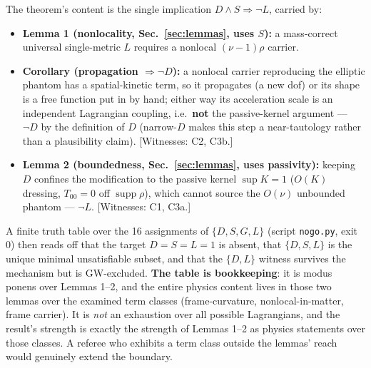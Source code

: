 \documentclass[11pt]{article}
\begin{document}
The theorem's content is the single implication $D\wedge S\Rightarrow\lnot L$, carried by:
\begin{itemize}
\item \textbf{Lemma 1 (nonlocality, Sec.~\ref{sec:lemmas}, uses $S$):} a mass-correct universal single-metric $L$ requires a nonlocal $(\nu-1)\rho$ carrier.
\item \textbf{Corollary (propagation $\Rightarrow\lnot D$):} a nonlocal carrier reproducing the elliptic phantom has a spatial-kinetic term, so it propagates (a new dof) or its shape is a free function put in by hand; either way its acceleration scale is an independent Lagrangian coupling, i.e.\ \textbf{not} the passive-kernel argument --- $\lnot D$ by the definition of $D$ (narrow-$D$ makes this step a near-tautology rather than a plausibility claim). [Witnesses: C2, C3b.]
\item \textbf{Lemma 2 (boundedness, Sec.~\ref{sec:lemmas}, uses passivity):} keeping $D$ confines the modification to the passive kernel $\sup K=1$ ($O(K)$ dressing, $T_{00}=0$ off $\operatorname{supp}\rho$), which cannot source the $O(\nu)$ unbounded phantom --- $\lnot L$. [Witnesses: C1, C3a.]
\end{itemize}
A finite truth table over the 16 assignments of $\{D,S,G,L\}$ (script \texttt{nogo.py}, exit 0) then reads off that the target $D=S=L=1$ is absent, that $\{D,S,L\}$ is the unique minimal unsatisfiable subset, and that the $\{D,L\}$ witness survives the mechanism but is GW-excluded. \textbf{The table is bookkeeping}: it is modus ponens over Lemmas 1--2, and the entire physics content lives in those two lemmas over the examined term classes (frame-curvature, nonlocal-in-matter, frame carrier). It is \emph{not} an exhaustion over all possible Lagrangians, and the result's strength is exactly the strength of Lemmas 1--2 as physics statements over those classes. A referee who exhibits a term class outside the lemmas' reach would genuinely extend the boundary.
\end{document}
